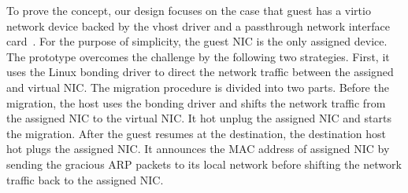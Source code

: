 To prove the concept, our design focuses on the case that
guest has a virtio network device backed by the vhost driver
and a passthrough network interface card~\cite{zhai:2008}. For
the purpose of simplicity, the guest NIC is the only assigned
device. The prototype overcomes the challenge by the following
two strategies. First, it uses the Linux bonding driver to
direct the network traffic between the assigned and virtual
NIC. The migration procedure is divided into two parts. Before
the migration, the host uses the bonding driver and shifts the
network traffic from the assigned NIC to the virtual NIC. It
hot unplug the assigned NIC and starts the migration. After
the guest resumes at the destination, the destination host hot
plugs the assigned NIC. It announces the MAC address of
assigned NIC by sending the gracious ARP packets to its local
network before shifting the network traffic back to the
assigned NIC.

%
